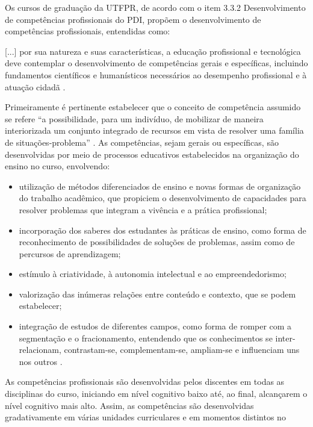 Os cursos de graduação da UTFPR, de acordo com o item 3.3.2 Desenvolvimento de competências profissionais do PDI, propõem o desenvolvimento de competências profissionais, entendidas como:

\begin{citacao}
    {[...]} por sua natureza e suas características, a educação profissional e tecnológica deve contemplar o desenvolvimento de competências gerais e específicas, incluindo fundamentos científicos e humanísticos necessários ao desempenho profissional e à atuação cidadã \cite{pdiutfpr}.
\end{citacao}

Primeiramente é pertinente estabelecer que o conceito de competência assumido se refere “a possibilidade, para um indivíduo, de mobilizar de maneira interiorizada um conjunto integrado de recursos em vista de resolver uma família de situações-problema” \cite{scallon2017}. As competências, sejam gerais ou específicas, são desenvolvidas por meio de processos educativos estabelecidos na organização do ensino no curso, envolvendo:

\begin{itemize}
    \item utilização de métodos diferenciados de ensino e novas formas de organização do trabalho acadêmico, que propiciem o desenvolvimento de capacidades para resolver problemas que integram a vivência e a prática profissional;
    \item incorporação dos saberes dos estudantes às práticas de ensino, como forma de reconhecimento de possibilidades de soluções de problemas, assim como de percursos de aprendizagem;
    \item estímulo à criatividade, à autonomia intelectual e ao empreendedorismo;
    \item valorização das inúmeras relações entre conteúdo e contexto, que se podem estabelecer;
    \item integração de estudos de diferentes campos, como forma de romper com a segmentação e o fracionamento, entendendo que os conhecimentos se inter-relacionam, contrastam-se, complementam-se, ampliam-se e influenciam uns nos outros \cite{pdiutfpr}.
\end{itemize}

As competências profissionais são desenvolvidas pelos discentes em todas as disciplinas do curso, iniciando em nível cognitivo baixo até, ao final, alcançarem o nível cognitivo mais alto. Assim, as competências são desenvolvidas gradativamente em várias unidades curriculares e em momentos distintos no decorrer do curso. 

